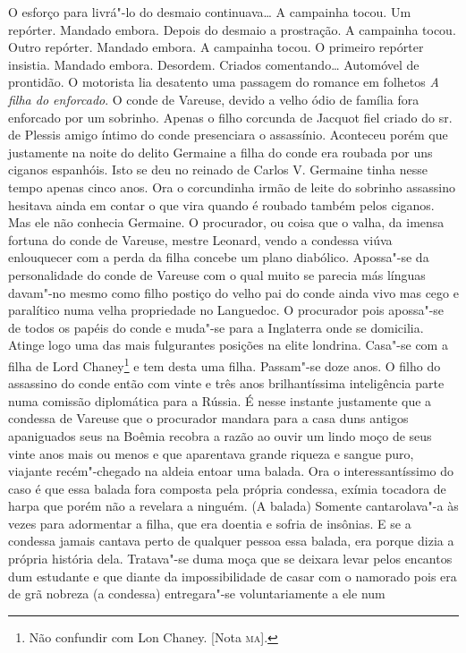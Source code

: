 O esforço para livrá"-lo do desmaio continuava\ldots{} A campainha tocou. Um
repórter. Mandado embora. Depois do desmaio a prostração. A campainha
tocou. Outro repórter. Mandado embora. A campainha tocou. O primeiro
repórter insistia. Mandado embora. Desordem. Criados comentando\ldots{}
Automóvel de prontidão. O motorista lia desatento uma passagem do
romance em folhetos \emph{A filha do enforcado}. O conde de Vareuse,
devido a velho ódio de família fora enforcado por um sobrinho. Apenas o
filho corcunda de Jacquot fiel criado do sr.\,de Plessis amigo íntimo do
conde presenciara o assassínio. Aconteceu porém que justamente na noite
do delito Germaine a filha do conde era roubada por uns ciganos
espanhóis. Isto se deu no reinado de Carlos V. Germaine tinha nesse
tempo apenas cinco anos. Ora o corcundinha irmão de leite do sobrinho
assassino hesitava ainda em contar o que vira quando é roubado também
pelos ciganos. Mas ele não conhecia Germaine. O procurador, ou coisa que
o valha, da imensa fortuna do conde de Vareuse, mestre Leonard, vendo a
condessa viúva enlouquecer com a perda da filha concebe um plano
diabólico. Apossa"-se da personalidade do conde de Vareuse com o qual
muito se parecia más línguas davam"-no mesmo como filho postiço do velho
pai do conde ainda vivo mas cego e paralítico numa velha propriedade no
Languedoc. O procurador pois apossa"-se de todos os papéis do conde e
muda"-se para a Inglaterra onde se domicilia. Atinge logo uma das mais
fulgurantes posições na elite londrina. Casa"-se com a filha de Lord
Chaney\footnote{Não confundir com Lon Chaney. {[}Nota \textsc{ma}{]}.} e tem
desta uma filha. Passam"-se doze anos. O filho do assassino do conde
então com vinte e três anos brilhantíssima inteligência parte numa
comissão diplomática para a Rússia. É nesse instante justamente que a
condessa de Vareuse que o procurador mandara para a casa duns antigos
apaniguados seus na Boêmia recobra a razão ao ouvir um lindo moço de
seus vinte anos mais ou menos e que aparentava grande riqueza e sangue
puro, viajante recém"-chegado na aldeia entoar uma balada. Ora o
interessantíssimo do caso é que essa balada fora composta pela própria
condessa, exímia tocadora de harpa que porém não a revelara a ninguém.
(A balada) Somente cantarolava"-a às vezes para adormentar a filha, que
era doentia e sofria de insônias. E se a condessa jamais cantava perto
de qualquer pessoa essa balada, era porque dizia a própria história
dela. Tratava"-se duma moça que se deixara levar pelos encantos dum
estudante e que diante da impossibilidade de casar com o namorado pois
era de grã nobreza (a condessa) entregara"-se voluntariamente a ele num
